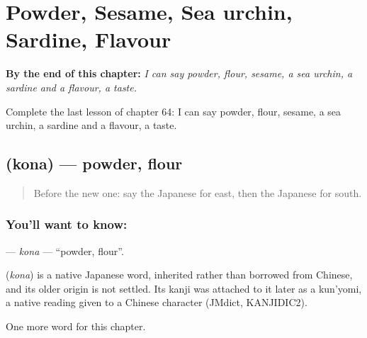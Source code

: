 
\chapter{Powder, Sesame, Sea urchin, Sardine, Flavour}
\label{ch:ja-powder-sesame-sea-urchin-sardine-flavour}

\begin{chapteropening}
\textbf{By the end of this chapter:} \emph{I can say powder, flour, sesame, a sea urchin, a sardine and a flavour, a taste.}

Complete the last lesson of chapter 64: I can say powder, flour, sesame, a sea urchin, a sardine and a flavour, a taste.
\end{chapteropening}

\section[\texorpdfstring{\ja{こな} (kona)}{こな (kona)}]{ (kona) — powder, flour}

\label{lesson:JA-C64-kona}



\begin{quote}
Before the new one: say the Japanese for east, then the Japanese for south.
\end{quote}

\subsection*{You'll want to know: }
\textbf{} — \emph{kona} — \textquotedblleft{}powder, flour\textquotedblright{}.

\begin{cousinweb}
\textbf{} (\emph{kona}) is a native Japanese word, inherited rather than borrowed from Chinese, and its older origin is not settled. Its kanji was attached to it later as a kun'yomi, a native reading given to a Chinese character (JMdict, KANJIDIC2).
\end{cousinweb}

\begin{grammarlens}[title={What you've built}]
One more word for this chapter.
\end{grammarlens}

